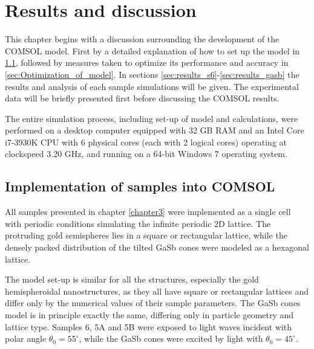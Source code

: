 
\chapter{Results and discussion}
This chapter begins with a discussion surrounding the development of the COMSOL model. First by a detailed explanation of how to set up the model in \ref{sec:results_implementation}, followed by measures taken to optimize its performance and accuracy in \ref{sec:Optimization_of_model}. In sections \ref{sec:results_s6}-\ref{sec:results_gasb} the results and analysis of each sample simulations will be given. The experimental data will be briefly presented first before discussing the COMSOL results.

The entire simulation process, including set-up of model and calculations, were performed on a desktop computer equipped with 32 GB RAM and an Intel Core i7-3930K CPU with 6 physical cores (each with 2 logical cores) operating at clockspeed 3.20 GHz, and running on a 64-bit Windows 7 operating system.
\section{Implementation of samples into COMSOL}
\label{sec:results_implementation}
All samples presented in chapter \ref{chapter3} were implemented as a single cell with periodic conditions simulating the infinite periodic 2D lattice. The protruding gold semispheres lies in a square or rectangular lattice, while the densely packed distribution of the tilted GaSb cones were modeled as a hexagonal lattice.

The model set-up is similar for all the structures, especially the gold hemispheroidal nanostructures, as they all have square or rectangular lattices and differ only by the numerical values of their sample parameters. The GaSb cones model is in principle exactly the same, differing only in particle geometry and lattice type. Samples 6, 5A and 5B were exposed to light waves incident with polar angle $\theta_0=55^\circ$, while the GaSb cones were excited by light with $\theta_0=45^\circ$.

